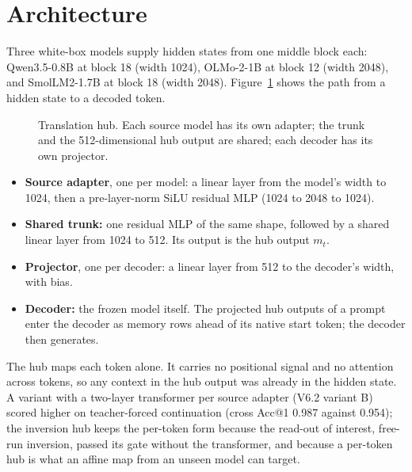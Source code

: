 \section{Architecture}\label{sec:hub:arch}

Three white-box models supply hidden states from one middle block each: Qwen3.5-0.8B at block 18 (width 1024), OLMo-2-1B at block 12 (width 2048), and SmolLM2-1.7B at block 18 (width 2048). Figure~\ref{fig:hub:arch} shows the path from a hidden state to a decoded token.

\begin{figure}[ht]
\centering
{}
\caption{Translation hub. Each source model has its own adapter; the trunk and the 512-dimensional hub output are shared; each decoder has its own projector.}
\label{fig:hub:arch}
\end{figure}

\begin{itemize}
\item \textbf{Source adapter}, one per model: a linear layer from the model's width to 1024, then a pre-layer-norm SiLU residual MLP (1024 to 2048 to 1024).
\item \textbf{Shared trunk:} one residual MLP of the same shape, followed by a shared linear layer from 1024 to 512. Its output is the hub output $m_t$.
\item \textbf{Projector}, one per decoder: a linear layer from 512 to the decoder's width, with bias.
\item \textbf{Decoder:} the frozen model itself. The projected hub outputs of a prompt enter the decoder as memory rows ahead of its native start token; the decoder then generates.
\end{itemize}

The hub maps each token alone. It carries no positional signal and no attention across tokens, so any context in the hub output was already in the hidden state. A variant with a two-layer transformer per source adapter (V6.2 variant B) scored higher on teacher-forced continuation (cross Acc@1 0.987 against 0.954); the inversion hub keeps the per-token form because the read-out of interest, free-run inversion, passed its gate without the transformer, and because a per-token hub is what an affine map from an unseen model can target.
